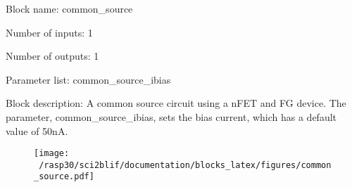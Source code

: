 \pagebreak

Block name: common\_source

Number of inputs: 1

Number of outputs: 1

Parameter list: common\_source\_ibias

Block description: 
A common source circuit using a nFET and FG device. The parameter, common\_source\_ibias, sets the bias current, which has a default value of 50nA.

\begin{figure}[H]  %
\texttt{[image: ~/rasp30/sci2blif/documentation/blocks\_latex/figures/common\_source.pdf]}
\end{figure}

